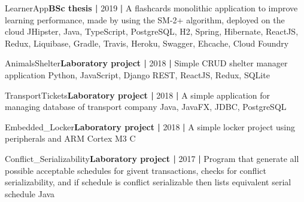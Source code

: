 

\begin{projects}
	\project
	{LearnerApp}{\textbf{BSc thesis |} 2019 \textbf{|}}
	{}
	{A flashcards monolithic application to improve learning performance, made by using the SM-2+ algorithm, deployed on the cloud}
	{JHipster, Java, TypeScript, PostgreSQL, H2, Spring, Hibernate, ReactJS, Redux, Liquibase, Gradle, Travis, Heroku, Swagger, Ehcache, Cloud Foundry}
	
	\project
	{AnimalsShelter}{\textbf{Laboratory project |} 2018 \textbf{|}}
	{}
	{Simple CRUD shelter manager application}
	{Python, JavaScript, Django REST, ReactJS, Redux, SQLite}
	
	\project
	{TransportTickets}{\textbf{Laboratory project |} 2018 \textbf{|}}
	{}
	{A simple application for managing database of transport company}
	{Java, JavaFX, JDBC, PostgreSQL}
	
	\project
	{Embedded\_Locker}{\textbf{Laboratory project |} 2018 \textbf{|}}
	{}
	{A simple locker project using peripherals and ARM Cortex M3}
	{C}
	
	\project
	{Conflict\_Serializability}{\textbf{Laboratory project |} 2017 \textbf{|}}
	{}
	{Program that generate all possible acceptable schedules for givent transactions, checks for conflict serializability, and if schedule is conflict serializable then lists equivalent serial schedule}
	{Java}
\end{projects}